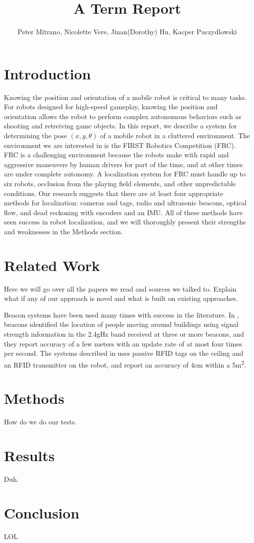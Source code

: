 \documentclass{article}
\begin{document}
\title{A Term Report}
\author{Peter Mitrano, Nicolette Vere, Jinan(Dorothy) Hu, Kacper Puczydlowski}

\maketitle{}

\section{Introduction}

Knowing the position and orientation of a mobile robot is critical to many tasks. For robots designed for high-speed gameplay, knowing the position and orientation allows the robot to perform complex autonomous behaviors such as shooting and retreiving game objects. In this report, we describe a system for determining the pose $(x, y, \theta)$ of a mobile robot in a cluttered environment. The environment we are interested in is the FIRST Robotics Competition (FRC). FRC is a challenging environment because the robots make with rapid and aggressive maneuvers by human drivers for part of the time, and at other times are under complete autonomy. A localization system for FRC must handle up to six robots, occlusion from the playing field elements, and other unpredictable conditions. Our research suggests that there are at least four appropriate methods for localization: cameras and tags, radio and ultrasonic beacons, optical flow, and dead reckoning with encoders and an IMU. All of these methods have seen success in robot localization, and we will thoroughly present their strengths and weaknesses in the Methods section.

\section{Related Work}

Here we will go over all the papers we read and sources we talked to. Explain what if any of our approach is novel and what is built on existing approaches.

Beacon systems have been used many times with success in the literature. In \cite{bahl_radar:_2000}, beacons identified the location of people moving around buildings using signal strength information in the 2.4gHz band received at three or more beacons, and they report accuracy of a few meters with an update rate of at most four times per second. The systems described in \cite{digiampaolo_mobile_2014} uses passive RFID tags on the ceiling and an RFID transmitter on the robot, and report an accuracy of 4cm within a 5\si{\square\meter}.

\section{Methods}

How do we do our tests.

\section{Results}

Duh.

\section{Conclusion}
LOL




\end{document}
